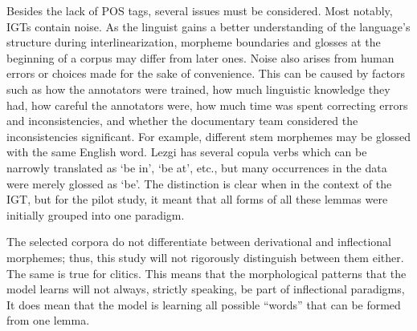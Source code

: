 
Besides the lack of POS tags, several issues must be considered. Most notably, IGTs contain noise. 
As the linguist gains a better understanding of the language's structure during interlinearization, morpheme boundaries and glosses at the beginning of a corpus may differ from later ones. 
Noise also arises from human errors or choices made for the sake of convenience. This can be caused by factors such as how the annotators were trained, how much linguistic knowledge they had, how careful the annotators were, how much time was spent correcting errors and inconsistencies, and whether the documentary team considered the inconsistencies significant.
For example, different stem morphemes may be glossed with the same English word. Lezgi has several copula verbs which can be narrowly translated as `be in', `be at', etc., but many occurrences in the data were merely glossed as `be'. The distinction is clear when in the context of the IGT, but for the pilot study, it meant that all forms of all these lemmas were initially grouped into one paradigm.  
    
The selected corpora do not differentiate between derivational and inflectional morphemes; thus, this study will not rigorously distinguish between them either. The same is true for clitics. This means that the morphological patterns that the model learns will not always, strictly speaking, be part of inflectional paradigms, It does mean that the model is learning all possible ``words'' that can be formed from one lemma.

